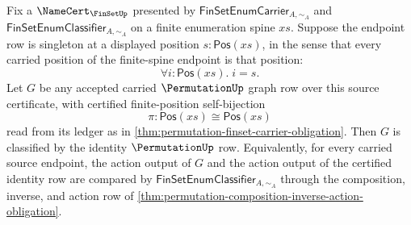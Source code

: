 \begin{theorem}
\label{thm:permutation-singleton-finset-identity-classifier}
Fix a $\NameCert_{\FinSetUp}$ presented by $\mathsf{FinSetEnumCarrier}_{A,\sim_A}$ and $\mathsf{FinSetEnumClassifier}_{A,\sim_A}$ on a finite enumeration spine $xs$. Suppose the endpoint row is singleton at a displayed position $s:\mathsf{Pos}(xs)$, in the sense that every carried position of the finite-spine endpoint is that position:
$$
\forall i:\mathsf{Pos}(xs).\; i=s.
$$
Let $G$ be any accepted carried $\PermutationUp$ graph row over this source certificate, with certified finite-position self-bijection
$$
\pi:\mathsf{Pos}(xs)\cong\mathsf{Pos}(xs)
$$
read from its ledger as in \autoref{thm:permutation-finset-carrier-obligation}. Then $G$ is classified by the identity $\PermutationUp$ row. Equivalently, for every carried source endpoint, the action output of $G$ and the action output of the certified identity row are compared by $\mathsf{FinSetEnumClassifier}_{A,\sim_A}$ through the composition, inverse, and action row of \autoref{thm:permutation-composition-inverse-action-obligation}.
\end{theorem}

